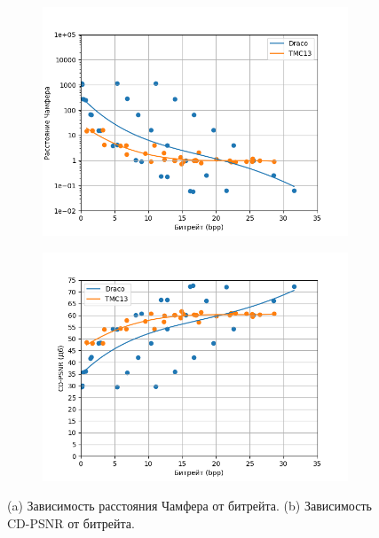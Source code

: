 \begin{figure}[H]
    \centering
    \begin{subfigure}{0.49\textwidth}
        \includegraphics[width=\linewidth]{assets/pcc_arena/approx_cd_p2pt.png}
        \caption{}
    \end{subfigure}
    \begin{subfigure}{0.49\textwidth}
        \includegraphics[width=\linewidth]{assets/pcc_arena/approx_cdpsnr_p2pt.png}
        \caption{}
    \end{subfigure}
    \caption{ (a) Зависимость расстояния Чамфера от битрейта. (b) Зависимость
    CD-PSNR от битрейта. }
    \label{img:pcc_arena_cd_bpp}
\end{figure}

